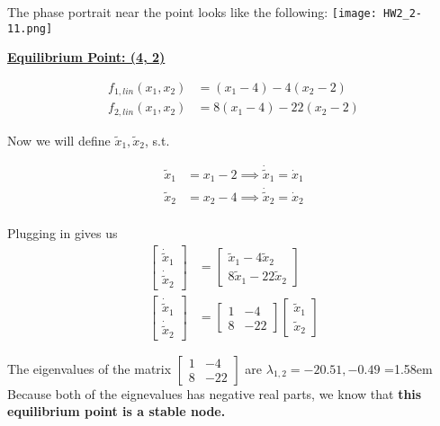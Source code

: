 \documentclass{article}
\begin{document}
  The phase portrait near the point looks like the following: \hspace{4mm}
  \texttt{[image: HW2\_2-11.png]} \newpage

  \textbf{\underline{Equilibrium Point: (4,\hspace{0.4mm} 2)}}

  \begin{align*}
    f_{1, lin}(x_1,x_2) &= (x_1 - 4) - 4(x_2 - 2) \\
    f_{2, lin}(x_1,x_2) &= 8(x_1 - 4) - 22(x_2 - 2)
  \end{align*}

  \indent Now we will define $\tilde{x}_1, \tilde{x}_2$, s.t.

  \begin{align*}
    \tilde{x}_1 &= x_1-2 \implies \dot{\tilde{x}}_1 = \dot{x}_1 \\
    \tilde{x}_2 &= x_2-4 \implies \dot{\tilde{x}}_2 = \dot{x}_2 \\
  \end{align*}
  
  \indent Plugging in gives us
  \begin{align*}
    \begin{bmatrix}
      \dot{\tilde{x}}_1 \\
      \dot{\tilde{x}}_2
    \end{bmatrix} &=
    \begin{bmatrix}
      \tilde{x}_1 - 4\tilde{x}_2 \\
      8\tilde{x}_1 - 22\tilde{x}_2
    \end{bmatrix} \\
    \begin{bmatrix}
      \dot{\tilde{x}}_1 \\
      \dot{\tilde{x}}_2
    \end{bmatrix} &=
    \begin{bmatrix}
      1 & -4 \\
      8 & -22 
    \end{bmatrix} 
    \begin{bmatrix}
      \tilde{x}_1 \\
      \tilde{x}_2
    \end{bmatrix} 
  \end{align*}

  The eigenvalues of the matrix $\begin{bmatrix}
      1 & -4 \\
      8 & -22 
  \end{bmatrix}$ are $\lambda_{1,2} = -20.51, -0.49$
  \hangindent=1.58em
   Because both of the eignevalues has negative real parts, we know that \textbf{this
  equilibrium point is a stable node.} \newline
 
\end{document}
